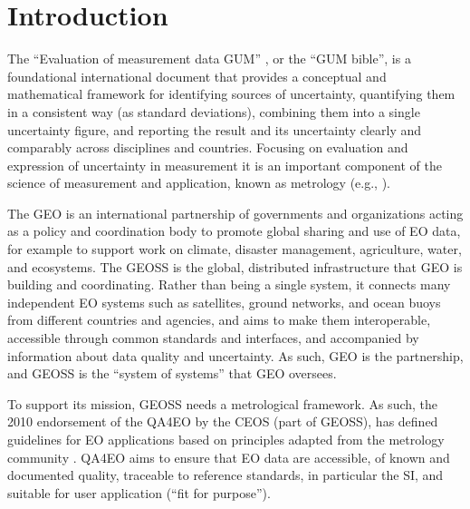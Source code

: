 \documentclass[a4paper,10pt,english]{sphinxmanual}
\begin{document}
\section{Introduction}
\label{\detokenize{04_uncertainty_analysis:introduction}}
\sphinxAtStartPar
The “Evaluation of measurement data \textendash{} GUM” {\hyperref[\detokenize{04_uncertainty_analysis:ref-jcgmgum}]{}}, or the “GUM bible”, is a foundational international document that provides a conceptual and mathematical framework for identifying sources of uncertainty, quantifying them in a consistent way (as standard deviations), combining them into a single uncertainty figure, and reporting the result and its uncertainty clearly and comparably across disciplines and countries. Focusing on evaluation and expression of uncertainty in measurement it is an important component of the science of measurement and application, known as metrology (e.g., {\hyperref[\detokenize{04_uncertainty_analysis:ref-jcgmvim}]{}}).

\sphinxAtStartPar
The GEO is an international partnership of governments and organizations acting as a policy and coordination body to promote global sharing and use of EO data, for example to support work on climate, disaster management, agriculture, water, and ecosystems. The GEOSS is the global, distributed infrastructure that GEO is building and coordinating. Rather than being a single system, it connects many independent EO systems \textendash{} such as satellites, ground networks, and ocean buoys \textendash{} from different countries and agencies, and aims to make them interoperable, accessible through common standards and interfaces, and accompanied by information about data quality and uncertainty. As such, GEO is the partnership, and GEOSS is the “system of systems” that GEO oversees.

\sphinxAtStartPar
To support its mission, GEOSS needs a metrological framework. As such, the 2010 endorsement of the QA4EO by the CEOS (part of GEOSS), has defined guidelines for EO applications based on principles adapted from the metrology community {\hyperref[\detokenize{04_uncertainty_analysis:ref-qa4eo1}]{}}. QA4EO aims to ensure that EO data are accessible, of known and documented quality, traceable to reference standards, in particular the SI, and suitable for user application (“fit for purpose”).
\end{document}

